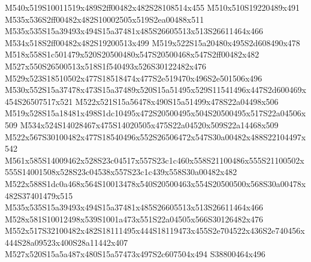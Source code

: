 \documentclass{article}
\begin{document}
\begin{multicols}{2}





M540x519S10011519x489S2ff00482x482S28108514x455 M510x510S19220489x491 M535x536S2ff00482x482S10002505x519S2ea00488x511 M535x535S15a39493x494S15a37481x485S26605513x513S26611464x466 M534x518S2ff00482x482S19200513x499 M519x522S15a20480x495S2d608490x478 M518x558S1c501479x520S20500480x547S20500468x547S2ff00482x482 M527x550S26500513x518S1f540493x526S30122482x476 M529x523S18510502x477S18518474x477S2e519470x496S2e501506x496 M530x552S15a37478x473S15a37489x520S15a51495x529S11541496x447S2d600469x454S26507517x521 M522x521S15a56478x490S15a51499x478S22a04498x506 M519x528S15a18481x498S1dc10495x472S20500495x504S20500495x517S22a04506x509 M534x524S14028467x475S14020505x475S22a04520x509S22a14468x509 M522x567S30100482x477S18540496x552S26506472x547S30a00482x488S22104497x542 M561x585S14009462x528S23c04517x557S23c1c460x558S21100486x555S21100502x555S14001508x528S23c04538x557S23c1c439x558S30a00482x482 M522x588S1dc0a468x564S10013478x540S20500463x554S20500500x568S30a00478x482S37401479x515 M535x535S15a39493x494S15a37481x485S26605513x513S26611464x466 M528x581S10012498x539S1001a473x551S22a04505x566S30126482x476 M552x517S32100482x482S18111495x444S18119473x455S2e704522x436S2e740456x444S28a09523x400S28a11442x407 M527x520S15a5a487x480S15a57473x497S2c607504x494 S38800464x496



\end{multicols}
\end{document}
